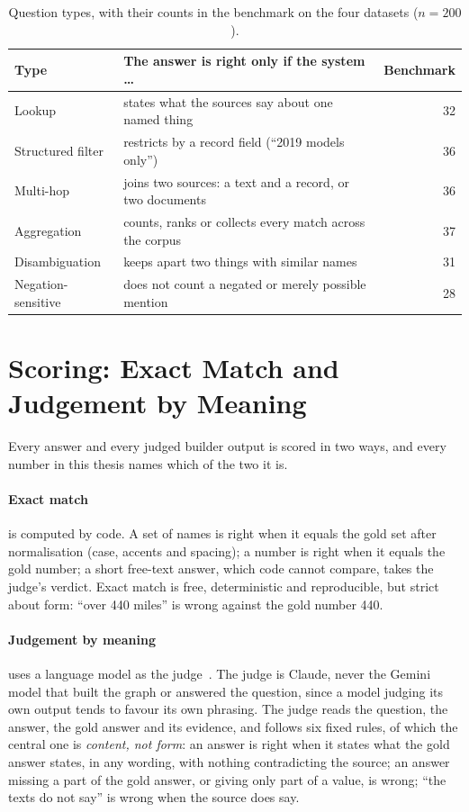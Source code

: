 \begin{table}[htbp]
\centering
\caption{Question types, with their counts in the benchmark on the four datasets ($n=200$).}
\label{tab:question-types}
\small
\begin{tabularx}{\linewidth}{@{}lXr@{}}
\toprule
Type & The answer is right only if the system \dots & Benchmark \\
\midrule
Lookup & states what the sources say about one named thing & 32 \\
Structured filter & restricts by a record field (``2019 models only'') & 36 \\
Multi-hop & joins two sources: a text and a record, or two documents & 36 \\
Aggregation & counts, ranks or collects every match across the corpus & 37 \\
Disambiguation & keeps apart two things with similar names & 31 \\
Negation-sensitive & does not count a negated or merely possible mention & 28 \\
\bottomrule
\end{tabularx}
\end{table}

\section{Scoring: Exact Match and Judgement by Meaning}\label{sec:ch03-scoring-exact-match-and-judgement}

Every answer and every judged builder output is scored in two ways, and every number in this thesis names
which of the two it is.

\paragraph{Exact match} is computed by code. A set of names is right when it equals the gold set after
normalisation (case, accents and spacing); a number is right when it equals the gold number; a short free-text
answer, which code cannot compare, takes the judge's verdict. Exact match is free, deterministic and
reproducible, but strict about form: ``over 440 miles'' is wrong against the gold number 440.

\paragraph{Judgement by meaning} uses a language model as the judge~\cite{zheng2023judging}. The judge is
Claude, never the Gemini model that built the graph or answered the question, since a model judging its own
output tends to favour its own phrasing. The judge reads the question, the answer, the gold answer and its
evidence, and follows six fixed rules, of which the central one is \emph{content, not form}: an answer is right
when it states what the gold answer states, in any wording, with nothing contradicting the source; an answer
missing a part of the gold answer, or giving only part of a value, is wrong; ``the texts do not say'' is wrong
when the source does say.

